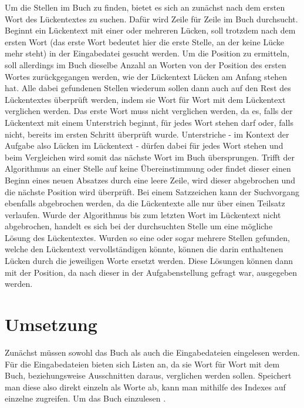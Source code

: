 \documentclass[a4paper,10pt,ngerman]{scrartcl}
\begin{document}
		Um die Stellen im Buch zu finden,
		bietet es sich an zunächst nach dem ersten Wort des Lückentextes zu suchen.
		Dafür wird Zeile für Zeile im Buch durchsucht.
		Beginnt ein Lückentext mit einer oder mehreren Lücken,
		soll trotzdem nach dem ersten Wort
		(das erste Wort bedeutet hier die erste Stelle,
		an der keine Lücke mehr steht)
		in der Eingabedatei gesucht werden.
		Um die Position zu ermitteln,
		soll allerdings im Buch dieselbe Anzahl an Worten von der Position des ersten Wortes zurückgegangen werden,
		wie der Lückentext Lücken am Anfang stehen hat.
		Alle dabei gefundenen Stellen wiederum sollen dann auch auf den Rest des Lückentextes überprüft werden,
		indem sie Wort für Wort mit dem Lückentext verglichen werden.
		Das erste Wort muss nicht verglichen werden,
		da es,
		falls der Lückentext mit einem Unterstrich beginnt,
		für jedes Wort stehen darf
		oder,
		falls nicht,
		bereits im ersten Schritt überprüft wurde.
		Unterstriche
		- im Kontext der Aufgabe also Lücken im Lückentext -
		dürfen dabei für jedes Wort stehen
		und beim Vergleichen wird somit das nächste Wort im Buch übersprungen.
		Trifft der Algorithmus an einer Stelle auf keine Übereinstimmung
		oder findet dieser einen Beginn eines neuen Absatzes durch eine leere Zeile,
		wird dieser abgebrochen
		und die nächste Position wird überprüft.
		Bei einem Satzzeichen kann der Suchvorgang ebenfalls abgebrochen werden,
		da die Lückentexte alle nur über einen Teilsatz verlaufen.
		Wurde der Algorithmus bis zum letzten Wort im Lückentext nicht abgebrochen,
		handelt es sich bei der durchsuchten Stelle um eine mögliche Lösung des Lückentextes.
		Wurden so eine oder sogar mehrere Stellen gefunden,
		welche den Lückentext vervollständigen könnte,
		können die darin enthaltenen Lücken durch die jeweiligen Worte ersetzt werden.
		Diese Lösungen können dann mit der Position,
		da nach dieser in der Aufgabenstellung gefragt war,
		ausgegeben werden.

	\section{Umsetzung}\label{sec:umsetzung}
		Zunächst müssen sowohl das Buch als auch die Eingabedateien eingelesen werden.
		Für die Eingabedateien bieten sich Listen an,
		da sie Wort für Wort mit dem Buch,
		beziehungsweise Ausschnitten daraus,
		verglichen werden sollen.
		Speichert man diese also direkt einzeln als Worte ab,
		kann man mithilfe des Indexes auf einzelne zugreifen.
		Um das Buch einzulesen .
\end{document}
